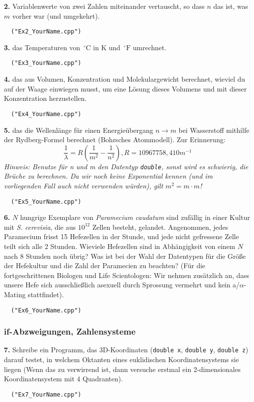 \documentclass[paper=A4, pagesize, DIV=calc, smallheadings,
fontsize=11pt, expansion=false]{scrreprt}
\begin{document}
\textbf{2.} Variablenwerte von zwei Zahlen miteinander vertauscht, so dass $n$ das ist, was $m$ vorher war (und umgekehrt).
\begin{verbatim}
  ("Ex2_YourName.cpp")
\end{verbatim}

\textbf{3.} das Temperaturen von $\,^{\circ}\mathrm{C}$ in K und  $\,^{\circ}\mathrm{F}$ umrechnet.
\begin{verbatim}
  ("Ex3_YourName.cpp")
\end{verbatim}

\textbf{4.} das aus Volumen, Konzentration und Molekulargewicht berechnet, wieviel du auf der Waage einwiegen musst, um eine Lösung dieses Volumens und mit dieser Konzentration herzustellen.
\begin{verbatim}
  ("Ex4_YourName.cpp")
\end{verbatim}

\textbf{5.} das die Wellenlänge für einen Energieübergang $n\rightarrow m$ bei Wasserstoff mithilfe der Rydberg-Formel berechnet (Bohrsches Atommodell). Zur Erinnerung:  
  \[\frac{1}{\lambda} = R \left( \frac{1}{m^2} - \frac{1}{n^2}\right), R = 10967758,4 10 m^{-1} \]
\textit{Hinweis: Benutze für n und m den Datentyp \textup{\texttt{double}}, sonst wird es schwierig, die Brüche zu berechnen. Da wir noch keine Exponential kennen (und im vorliegenden Fall auch nicht verwenden würden), gilt $m^2=m \cdot m$!}
\begin{verbatim}
  ("Ex5_YourName.cpp")
\end{verbatim}


\textbf{6.} $N$ hungrige Exemplare von \emph{Paramecium caudatum} sind zufällig in einer Kultur mit \emph{S. cerevisia}, die aus $10^{12}$ Zellen besteht, gelandet.
Angenommen, jedes Paramecium frisst 15 Hefezellen in der Stunde, und jede nicht gefressene Zelle teilt sich alle 2 Stunden.
Wieviele Hefezellen sind in Abhängigkeit von einem $N$ nach 8 Stunden noch übrig? Was ist bei der Wahl der Datentypen für die Größe der Hefekultur und die Zahl der Paramecien zu beachten?\newline
\small
(Für die fortgeschrittenen Biologen und Life Scientologen: Wir nehmen zusätzlich an, dass unsere Hefe sich ausschließlich asexuell durch Sprossung vermehrt und kein a/$\alpha$-Mating stattfindet).
\begin{verbatim}
  ("Ex6_YourName.cpp")
\end{verbatim}



\subsubsection*{if-Abzweigungen, Zahlensysteme}
\textbf{7.} Schreibe ein Programm, das 3D-Koordinaten (\texttt{double x}, \texttt{double y}, \texttt{double z}) darauf testet, in welchem Oktanten eines euklidischen Koordinatensystems sie liegen (Wenn das zu verwirrend ist, dann versuche erstmal ein 2-dimensionales Koordinatensystem mit 4 Quadranten).
\begin{verbatim}
  ("Ex7_YourName.cpp")
\end{verbatim}
\end{document}
